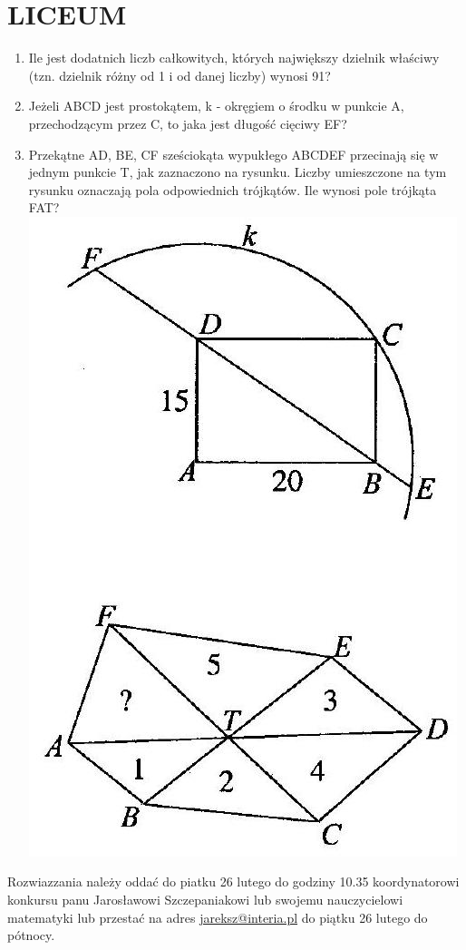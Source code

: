 \documentclass[10pt]{article}
\begin{document}
\section*{LICEUM}
\begin{enumerate}
  \item Ile jest dodatnich liczb całkowitych, których największy dzielnik właściwy (tzn. dzielnik różny od 1 i od danej liczby) wynosi 91?
  \item Jeżeli ABCD jest prostokątem, k - okręgiem o środku w punkcie A, przechodzącym przez C, to jaka jest długość cięciwy EF?
  \item Przekątne AD, BE, CF sześciokąta wypukłego ABCDEF przecinają się w jednym punkcie T, jak zaznaczono na rysunku. Liczby umieszczone na tym rysunku oznaczają pola odpowiednich trójkątów. Ile wynosi pole trójkąta FAT?\\
\includegraphics[max width=\textwidth, center]{2024_11_21_78948defe3ef45fddd28g-1}
\end{enumerate}

Rozwiazzania należy oddać do piatku 26 lutego do godziny 10.35 koordynatorowi konkursu panu Jarosławowi Szczepaniakowi lub swojemu nauczycielowi matematyki lub przestać na adres \href{mailto:jareksz@interia.pl}{jareksz@interia.pl} do piątku 26 lutego do pótnocy.
\end{document}
